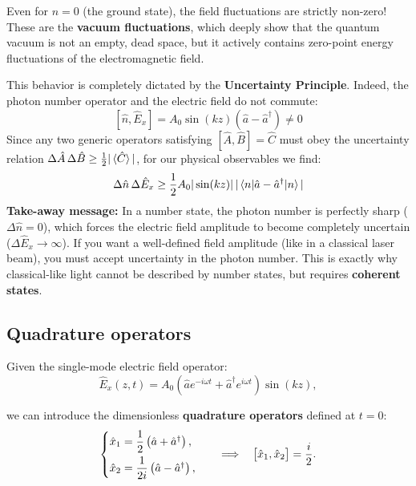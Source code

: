 {Even for $n=0$ (the ground state), the field fluctuations are strictly non-zero! These are the \textbf{vacuum fluctuations}, which deeply show that the quantum vacuum is not an empty, dead space, but it actively contains zero-point energy fluctuations of the electromagnetic field.

This behavior is completely dictated by the \textbf{Uncertainty Principle}. Indeed, the photon number operator and the electric field do not commute:
\[
[\hat{n}, \hat{E}_x] = A_0 \sin(kz) (\hat{a} - \hat{a}^\dagger) \neq 0
\]
Since any two generic operators satisfying $[\hat{A},\hat{B}] = \hat{C}$ must obey the uncertainty relation $\Delta \hat{A} \, \Delta \hat{B} \geq \frac{1}{2}|\braket{\hat{C}}|$, for our physical observables we find:
\[
\Delta \hat{n} \, \Delta \hat{E}_x \geq \frac{1}{2} A_0 |\sin(kz)| \, |\braket{n| \hat{a} - \hat{a}^\dagger |n}|
\]
\textbf{Take-away message:} In a number state, the photon number is perfectly sharp ($\Delta \hat{n} = 0$), which forces the electric field amplitude to become completely uncertain ($\Delta \hat{E}_x \to \infty$). If you want a well-defined field amplitude (like in a classical laser beam), you must accept uncertainty in the photon number. This is exactly why classical-like light cannot be described by number states, but requires \textbf{coherent states}.
}

\subsection{Quadrature operators}
Given the single-mode electric field operator:
\begin{equation}\label{eqn:11-single-mode-field-time}
\hat{E}_x(z,t) = A_0\left(\hat{a}e^{-i\omega t}+\hat{a}^\dagger e^{i\omega t}\right) \sin(kz),
\end{equation}

we can introduce the dimensionless \textbf{quadrature operators} defined at $t=0$:
\begin{equation}\label{eqn:11-quadrature-operators}
\begin{cases}
\hat{x}_1 = \dfrac{1}{2}\left(\hat{a}+\hat{a}^\dagger\right),\\[1.5ex]
\hat{x}_2 = \dfrac{1}{2i}\left(\hat{a}-\hat{a}^\dagger\right),
\end{cases}
\hspace{1.5ex} \implies \hspace{1.5ex} 
\bigl[\hat{x}_1,\hat{x}_2\bigr]=\dfrac{i}{2}.
\end{equation}

